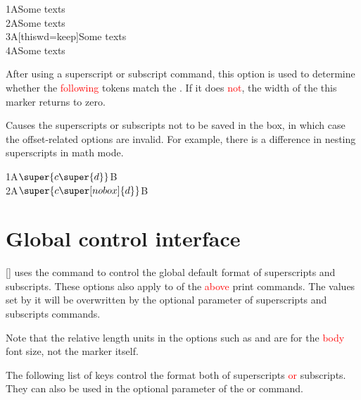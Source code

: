 \documentclass[load-preamble+]{cnltx-doc}
\renewcommand{\emph}[1]{\textcolor{red}{#1}}
\begin{document}
\begin{options}
\begin{demohigh}
1ASome texts \\
2ASome texts \\
3A[thiswd=keep]Some texts \\
4ASome texts
\end{demohigh}
  \dtag
  After using a superscript or subscript command, this option is used to determine whether the \textcolor{red}{following} tokens match the . If it does \textcolor{red}{not}, the width of the this marker returns to zero.
\begin{codehigh}
\newcommand{\mysp}[2][]{\super[regex=\c{mysb},#1]{#2}}
\newcommand{\mysb}[2][]{\sub[regex=\c{mysp},#1]{#2}}
\end{codehigh}
  \dtag{}%
  Causes the superscripts or subscripts not to be saved in the box, in which case the offset-related options are invalid. For example, there is a difference in nesting superscripts in math mode.
\begin{demohigh}
1A$\super{c\super{d}}$B \\
2A$\super{c\super[nobox]{d}}$B
\end{demohigh}
\end{options}

\section{Global control interface}
\label{sec:global control interface}
\begin{commands}
  []
   uses the  command to control the global default format of superscripts and subscripts. These options also apply to  of the \textcolor{red}{above} print commands. The values set by it will be overwritten by the optional parameter of superscripts and subscripts commands.

  Note that the relative length units in the options such as  and  are for the \textcolor{red}{body} font size, not the marker itself.

  The following list of keys control the format both of superscripts \emph{or} subscripts. They can also be used in the optional parameter of the  or  command.
\end{commands}
\end{document}
